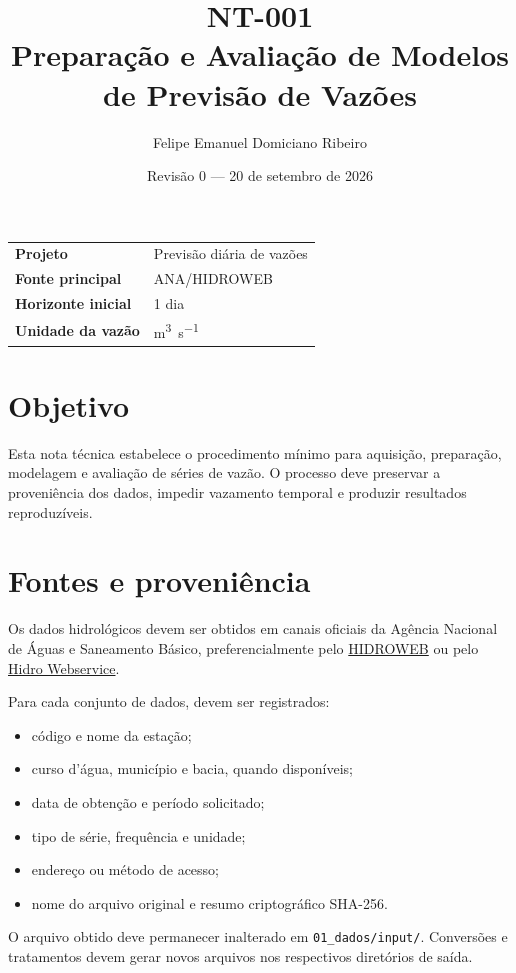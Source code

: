 \documentclass[12pt,a4paper]{article}
\title{NT-001\\Preparação e Avaliação de Modelos de Previsão de Vazões}
\author{Felipe Emanuel Domiciano Ribeiro}
\date{Revisão 0 — 20 de setembro de 2026}
\begin{document}
\maketitle

\begin{center}
\begin{tabular}{ll}
\toprule
\textbf{Projeto} & Previsão diária de vazões \tabularnewline
\textbf{Fonte principal} & ANA/HIDROWEB \tabularnewline
\textbf{Horizonte inicial} & 1 dia \tabularnewline
\textbf{Unidade da vazão} & \si{\cubic\metre\per\second} \tabularnewline
\bottomrule
\end{tabular}
\end{center}

\section{Objetivo}

Esta nota técnica estabelece o procedimento mínimo para aquisição, preparação,
modelagem e avaliação de séries de vazão. O processo deve preservar a
proveniência dos dados, impedir vazamento temporal e produzir resultados
reproduzíveis.

\section{Fontes e proveniência}

Os dados hidrológicos devem ser obtidos em canais oficiais da Agência Nacional
de Águas e Saneamento Básico, preferencialmente pelo
\href{https://www.snirh.gov.br/hidroweb/}{HIDROWEB} ou pelo
\href{https://www.ana.gov.br/hidrowebservice/swagger-ui/index.html}{Hidro Webservice}.

Para cada conjunto de dados, devem ser registrados:

\begin{itemize}
    \item código e nome da estação;
    \item curso d'água, município e bacia, quando disponíveis;
    \item data de obtenção e período solicitado;
    \item tipo de série, frequência e unidade;
    \item endereço ou método de acesso;
    \item nome do arquivo original e resumo criptográfico SHA-256.
\end{itemize}

O arquivo obtido deve permanecer inalterado em
\texttt{01\_dados/input/}. Conversões e tratamentos devem gerar novos arquivos
nos respectivos diretórios de saída.
\end{document}
